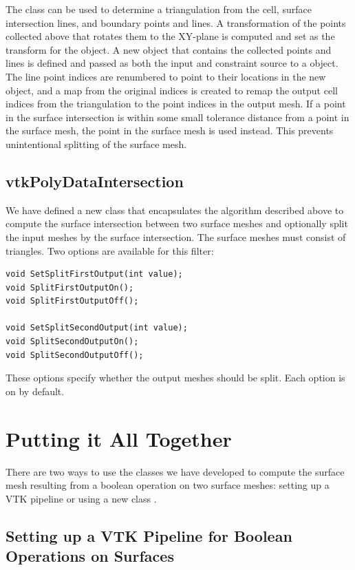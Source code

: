 \documentclass{InsightArticle}
\begin{document}
The  class can be used to determine a triangulation from the cell, surface intersection lines, and boundary points and lines. A transformation of the points collected above that rotates them to the XY-plane is computed and set as the transform for the  object. A new  object that contains the collected points and lines is defined and passed as both the input and constraint source to a  object. The line point indices are renumbered to point to their locations in the new  object, and a map from the original indices is created to remap the output cell indices from the triangulation to the point indices in the output mesh. If a point in the surface intersection is within some small tolerance distance from a point in the surface mesh, the point in the surface mesh is used instead. This prevents unintentional splitting of the surface mesh.

\subsection{vtkPolyDataIntersection}

We have defined a new class  that encapsulates the algorithm described above to compute the surface intersection between two surface meshes and optionally split the input meshes by the surface intersection. The surface meshes must consist of triangles. Two options are available for this filter:
\begin{verbatim}
void SetSplitFirstOutput(int value);
void SplitFirstOutputOn();
void SplitFirstOutputOff();

void SetSplitSecondOutput(int value);
void SplitSecondOutputOn();
void SplitSecondOutputOff();
\end{verbatim}
These options specify whether the output meshes should be split. Each option is on by default.

\section{Putting it All Together}

There are two ways to use the classes we have developed to compute the surface mesh resulting from a boolean operation on two surface meshes: setting up a VTK pipeline or using a new class .

\subsection{Setting up a VTK Pipeline for Boolean Operations on Surfaces}
\end{document}

